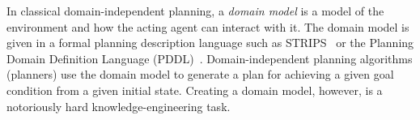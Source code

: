 \documentclass{article}
\begin{document}


In classical domain-independent planning, a \emph{domain model} is a model of the environment and how the acting agent can interact with it. The domain model is given in a formal planning description language such as STRIPS~\cite{fikes1971strips} or the Planning Domain Definition Language (PDDL)~\cite{mcdermott1998pddl}. Domain-independent planning algorithms (planners) use the domain model to  generate a plan for achieving a given goal condition from a given initial state. 
Creating a domain model, however, is a notoriously hard knowledge-engineering task. 
\end{document}
